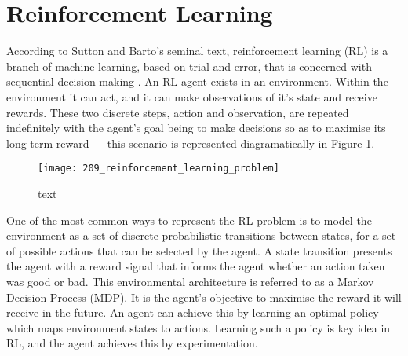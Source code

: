 \section{Reinforcement Learning}\label{rl}
According to Sutton and Barto's seminal text, reinforcement learning (RL) is a branch of machine learning, based on trial-and-error, that is concerned with sequential decision making \cite{Sutton2018}. An RL agent exists in an environment. Within the environment it can act, and it can make observations of it's state and receive rewards. These two discrete steps, action and observation, are repeated indefinitely with the agent's goal being to make decisions so as to maximise its long term reward --- this scenario is represented diagramatically in Figure \ref{fig:209_reinforcement_learning_problem}.

\begin{figure}[h]
	\centering
	\texttt{[image: 209\_reinforcement\_learning\_problem]}
	\caption{text}
	\label{fig:209_reinforcement_learning_problem}
\end{figure}

One of the most common ways to represent the RL problem is to model the environment as a set of discrete probabilistic transitions between states, for a set of possible actions that can be selected by the agent. A state transition presents the agent with a reward signal that informs the agent whether an action taken was good or bad. This environmental architecture is referred to as a Markov Decision Process (MDP). It is the agent's objective to maximise the reward it will receive in the future. An agent can achieve this by learning an optimal policy which maps environment states to actions. Learning such a policy is key idea in RL, and the agent achieves this by experimentation.


